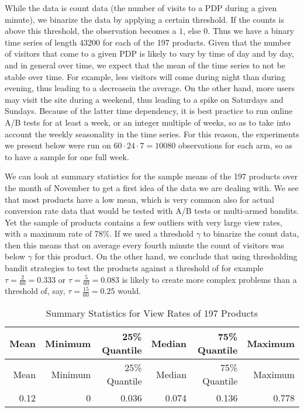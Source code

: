 \documentclass[12pt,]{article}
\begin{document}
While the data is count data (the number of visits to a PDP during a
given minute), we binarize the data by applying a certain threshold. If
the counts is above this threshold, the observation becomes a \(1\),
else \(0\). Thus we have a binary time series of length 43200 for each
of the 197 products. Given that the number of visitors that come to a
given PDP is likely to vary by time of day and by day, and in general
over time, we expect that the mean of the time series to not be stable
over time. For example, less visitors will come during night than during
evening, thus leading to a decreasein the average. On the other hand,
more users may visit the site during a weekend, thus leading to a spike
on Saturdays and Sundays. Because of the latter time dependency, it is
best practice to run online A/B tests for at least a week, or an integer
multiple of weeks, so as to take into account the weekly seasonality in
the time series. For this reason, the experiments we present below were
run on \(60 \cdot 24 \cdot 7 = 10080\) observations for each arm, so as
to have a sample for one full week.

We can look at summary statistics for the sample means of the 197
products over the month of November to get a first idea of the data we
are dealing with. We see that most products have a low mean, which is
very common also for actual conversion rate data that would be tested
with A/B tests or multi-armed bandits. Yet the sample of products
contains a few outliers with very large view rates, with a maximum rate
of 78\%. If we used a threshold \(\gamma\) to binarize the count data,
then this means that on average every fourth minute the count of
visitors was below \(\gamma\) for this product. On the other hand, we
conclude that using thresholding bandit strategies to test the products
against a threshold of for example \(\tau = \frac{2}{60} = 0.333\) or
\(\tau = \frac{5}{60} = 0.083\) is likely to create more complex
problems than a threshold of, say, \(\tau = \frac{15}{60} = 0.25\)
would.

\begin{longtable}[]{@{}rrrrrr@{}}
\caption{Summary Statistics for View Rates of 197
Products}\tabularnewline
\toprule
Mean & Minimum & 25\% Quantile & Median & 75\% Quantile &
Maximum\tabularnewline
\midrule
\endfirsthead
\toprule
Mean & Minimum & 25\% Quantile & Median & 75\% Quantile &
Maximum\tabularnewline
\midrule
\endhead
0.12 & 0 & 0.036 & 0.074 & 0.136 & 0.778\tabularnewline
\bottomrule
\end{longtable}
\end{document}
